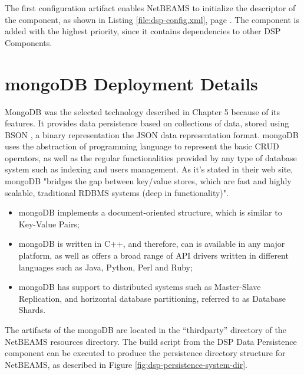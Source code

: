 The first configuration artifact enables NetBEAMS to initialize the
descriptor of the component, as shown in Listing \ref{file:dsp-config.xml},
page \pageref{file:dsp-config.xml}. The component is added with the highest
priority, since it contains dependencies to other DSP Components.

\section{mongoDB Deployment Details}
\label{sec:mongodb-deployment}

MongoDB was the selected technology described in Chapter 5 because of its
features. It provides data persistence based on collections of data, stored
using BSON \cite{bson}, a binary representation the JSON data representation
format. mongoDB uses the abstraction of programming language to represent the
basic CRUD operators, as well as the regular functionalities provided by any
type of database system such as indexing and users management. As it's stated
in their web site, mongoDB "bridges the gap between key/value stores, which
are fast and highly scalable, traditional RDBMS systems (deep in
functionality)".

\begin{itemize}
  \item mongoDB implements a document-oriented structure, which is similar to
  Key-Value Pairs;
  \item mongoDB is written in C++, and therefore, can is available in any major
  platform, as well as offers a broad range of API drivers written in
  different languages such as Java, Python, Perl and Ruby;
  \item mongoDB has support to distributed systems such as Master-Slave
  Replication, and horizontal database partitioning, referred to as Database
  Shards.
\end{itemize}

The artifacts of the mongoDB are located in the ``thirdparty'' directory of the
NetBEAMS resources directory. The build script from the DSP Data Persistence
component can be executed to produce the persistence directory structure for
NetBEAMS, as described in Figure \ref{fig:dsp-persistence-system-dir}.

